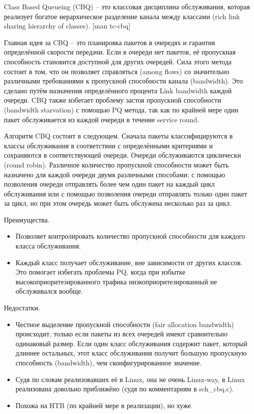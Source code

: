         Class Based Queueing (CBQ) -- это классовая дисциплина обслуживания, которая реализует
        богатое иерархическое разделение канала между классами (rich link sharing hierarchy of
        classes). [man tc-cbq]

        Главная идея за CBQ -- это планировка пакетов в очередях и гарантия определённой
        скорости передачи. Если в очереди нет пакетов, её пропускная способность
        становится доступной для других очередей. Сила этого метода состоит в том, что
        он позволяет справляться (among flows) со значительно различными требованиями
        к пропускной способности канала (bandwidth). Это сделано путём назначения
        определённого процента
        Link bandwidth каждой очереди. CBQ также избегает проблему застоя пропускной способности
        (bandwidth starvation) с помощью PQ метода, так как по крайней мере один пакет обслуживается
        из каждой очереди в течение service round.

        Алгоритм CBQ состоит в следующем. Сначала пакеты классифицируются в классы
        обслуживания в соответствии с определёнными критериями и сохраняются в
        соответствующей очереди. Очереди обслуживаются циклически (round robin). Различное
        количество пропускной способности может быть назначено для каждой очереди
        двумя различными способами: с помощью позволения очереди отправлять более
        чем один пакет на каждый цикл обслуживания или с помощью позволения очереди
        отправлять только один пакет за цикл, но при этом очередь может быть обслужена
        несколько раз за цикл.

        Преимущества.
		\begin{itemize}
        	\item Позволяет контролировать количество пропускной способности для каждого
                класса обслуживания.
        	\item Каждый класс получает обслуживание, вне зависимости от других классов. Это
                помогает избегать проблемы PQ, когда при избытке высокоприоритезированного
                трафика низкоприоритезированный не обслуживался вообще.
		\end{itemize}
        Недостатки.
		\begin{itemize}
            \item Честное выделение пропускной способности (fair allocation bandwidth) происходит, только если
        пакеты из всех очередей имеют сравнительно одинаковый размер. Если один класс
        обслуживания содержит пакет, который длиннее остальных, этот класс обслуживания
        получит большую пропускную способность (bandwidth), чем сконфигурированное значение.
			\item Судя по словам реализовавших её в Linux, она не очень Linux-way, в Linux
				  реализована довольно приближёно (судя по комментариям в sch\_cbq.c).
			\item Похожа на HTB (по крайней мере в реализации), но хуже.
		\end{itemize}

